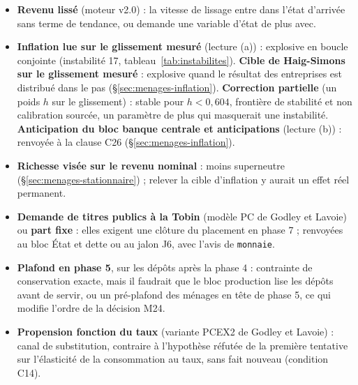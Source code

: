 \documentclass[11pt,a4paper]{article}
\begin{document}
\begin{itemize}
\item \textbf{Revenu lissé} (moteur v2.0) : la vitesse de lissage entre dans l'état d'arrivée sans terme de tendance, ou demande une variable d'état de plus avec.
\item \textbf{Inflation lue sur le glissement mesuré} (lecture (a)) : explosive en boucle conjointe (instabilité 17, tableau~\ref{tab:instabilites}). \textbf{Cible de Haig-Simons sur le glissement mesuré} : explosive quand le résultat des entreprises est distribué dans le pas (\S\ref{sec:menages-inflation}). \textbf{Correction partielle} (un poids $h$ sur le glissement) : stable pour $h < 0{,}604$, frontière de stabilité et non calibration sourcée, un paramètre de plus qui masquerait une instabilité. \textbf{Anticipation du bloc banque centrale et anticipations} (lecture (b)) : renvoyée à la clause C26 (\S\ref{sec:menages-inflation}).
\item \textbf{Richesse visée sur le revenu nominal} : moins superneutre (\S\ref{sec:menages-stationnaire}) ; relever la cible d'inflation y aurait un effet réel permanent.
\item \textbf{Demande de titres publics à la Tobin} (modèle PC de Godley et Lavoie) ou \textbf{part fixe} : elles exigent une clôture du placement en phase 7 ; renvoyées au bloc État et dette ou au jalon J6, avec l'avis de \texttt{monnaie}.
\item \textbf{Plafond en phase 5}, sur les dépôts après la phase 4 : contrainte de conservation exacte, mais il faudrait que le bloc production lise les dépôts avant de servir, ou un pré-plafond des ménages en tête de phase 5, ce qui modifie l'ordre de la décision M24.
\item \textbf{Propension fonction du taux} (variante PCEX2 de Godley et Lavoie) : canal de substitution, contraire à l'hypothèse réfutée de la première tentative sur l'élasticité de la consommation au taux, sans fait nouveau (condition C14).
\end{itemize}
\end{document}
